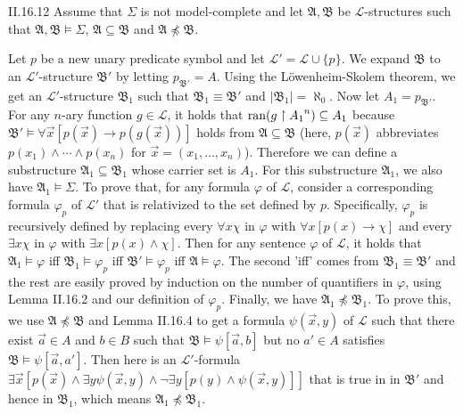 \documentclass[12pt]{article}
\begin{document}
\begin{customthm}{II.16.12}
  Assume that $\Sigma$ is not model-complete and let $\mathfrak{A},\mathfrak{B}$ be $\mathcal{L}$-structures such that $\mathfrak{A},\mathfrak{B}\models\Sigma$, $\mathfrak{A}\subseteq\mathfrak{B}$ and $\mathfrak{A}\not\preccurlyeq\mathfrak{B}$.

  Let $p$ be a new unary predicate symbol and let $\mathcal{L}'=\mathcal{L}\cup\{p\}$. We expand $\mathfrak{B}$ to an $\mathcal{L}'$-structure $\mathfrak{B}'$ by letting $p_{\mathfrak{B}'}=A$. Using the Löwenheim-Skolem theorem, we get an $\mathcal{L}'$-structure $\mathfrak{B}_1$ such that $\mathfrak{B}_1\equiv\mathfrak{B}'$ and $|\mathfrak{B}_1|=\aleph_0$. Now let $A_1=p_{\mathfrak{B}'}$. For any $n$-ary function $g\in\mathcal{L}$, it holds that $\mathop{\mathrm{ran}}(g\upharpoonright {A_1}^n)\subseteq A_1$ because $\mathfrak{B}'\models\forall\vec{x}[p(\vec{x})\rightarrow p(g(\vec{x}))]$ holds from $\mathfrak{A}\subseteq\mathfrak{B}$ (here, $p(\vec{x})$ abbreviates $p(x_1)\wedge\cdots\wedge p(x_n)$ for $\vec{x}=(x_1,\ldots,x_n)$). Therefore we can define a substructure $\mathfrak{A}_1\subseteq\mathfrak{B}_1$ whose carrier set is $A_1$. For this substructure $\mathfrak{A}_1$, we also have $\mathfrak{A}_1\models\Sigma$. To prove that, for any formula $\varphi$ of $\mathcal{L}$, consider a corresponding formula $\varphi_p$ of $\mathcal{L}'$ that is relativized to the set defined by $p$. Specifically, $\varphi_p$ is recursively defined by replacing every $\forall x\chi$ in $\varphi$ with $\forall x[p(x)\rightarrow\chi]$ and every $\exists x\chi$ in $\varphi$ with $\exists x[p(x)\wedge\chi]$. Then for any sentence $\varphi$ of $\mathcal{L}$, it holds that $\mathfrak{A}_1\models\varphi$ iff $\mathfrak{B}_1\models\varphi_p$ iff $\mathfrak{B}'\models\varphi_p$ iff $\mathfrak{A}\models\varphi$. The second 'iff' comes from $\mathfrak{B}_1\equiv\mathfrak{B}'$ and the rest are easily proved by induction on the number of quantifiers in $\varphi$, using Lemma II.16.2 and our definition of $\varphi_p$. Finally, we have $\mathfrak{A}_1\not\preccurlyeq\mathfrak{B}_1$. To prove this, we use $\mathfrak{A}\not\preccurlyeq\mathfrak{B}$ and Lemma II.16.4 to get a formula $\psi(\vec{x},y)$ of $\mathcal{L}$ such that there exist $\vec{a}\in A$ and $b\in B$ such that $\mathfrak{B}\models\psi[\vec{a},b]$ but no $a'\in A$ satisfies $\mathfrak{B}\models\psi[\vec{a},a']$. Then here is an $\mathcal{L}'$-formula $\exists\vec{x}[p(\vec{x})\wedge\exists y\psi(\vec{x},y)\wedge\neg\exists y[p(y)\wedge\psi(\vec{x},y)]]$ that is true in in $\mathfrak{B}'$ and hence in $\mathfrak{B}_1$, which means $\mathfrak{A}_1\not\preccurlyeq\mathfrak{B}_1$.


\end{customthm}
\end{document}
